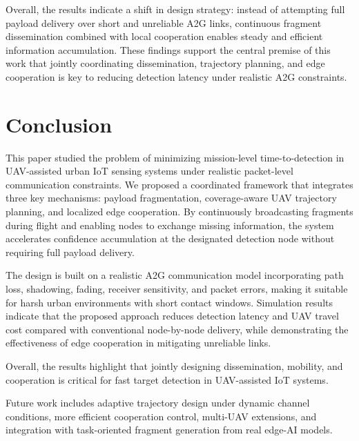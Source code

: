 \documentclass[conference]{IEEEtran}
\begin{document}
Overall, the results indicate a shift in design strategy: instead of attempting full payload delivery over short and unreliable A2G links, continuous fragment dissemination combined with local cooperation enables steady and efficient information accumulation. These findings support the central premise of this work that jointly coordinating dissemination, trajectory planning, and edge cooperation is key to reducing detection latency under realistic A2G constraints.

\section{Conclusion}

This paper studied the problem of minimizing mission-level time-to-detection in UAV-assisted urban IoT sensing systems under realistic packet-level communication constraints. We proposed a coordinated framework that integrates three key mechanisms: payload fragmentation, coverage-aware UAV trajectory planning, and localized edge cooperation. By continuously broadcasting fragments during flight and enabling nodes to exchange missing information, the system accelerates confidence accumulation at the designated detection node without requiring full payload delivery.

The design is built on a realistic A2G communication model incorporating path loss, shadowing, fading, receiver sensitivity, and packet errors, making it suitable for harsh urban environments with short contact windows. Simulation results indicate that the proposed approach reduces detection latency and UAV travel cost compared with conventional node-by-node delivery, while demonstrating the effectiveness of edge cooperation in mitigating unreliable links.

Overall, the results highlight that jointly designing dissemination, mobility, and cooperation is critical for fast target detection in UAV-assisted IoT systems.

Future work includes adaptive trajectory design under dynamic channel conditions, more efficient cooperation control, multi-UAV extensions, and integration with task-oriented fragment generation from real edge-AI models.






\end{document}
